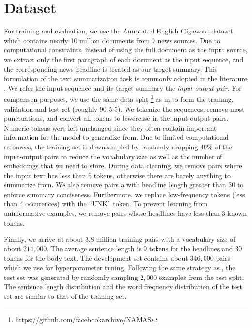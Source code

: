 \section{Dataset}
\label{sec: dataset}

For training and evaluation, we use the Annotated English Gigaword dataset \cite{graff2003english}, which contains nearly 10 million documents from 7 news sources. Due to computational constraints, instead of using the full document as the input source, we extract only the first paragraph of each document as the input sequence, and the corresponding news headline is treated as our target summary. This formulation of the text summarization task is commonly adopted in the literature \cite{rush2015neural}. We refer the input sequence and its target summary the \textit{input-output pair}. For comparison purposes, we use the same data split \footnote{https://github.com/facebookarchive/NAMAS} as in \cite{rush2015neural} to form the training, validation and test set (roughly 90-5-5). We tokenize the sequences, remove most punctuations, and convert all tokens to lowercase in the input-output pairs. Numeric tokens were left unchanged since they often contain important information for the model to generalize from. Due to limited computational resources, the training set is downsampled by randomly dropping $40\%$ of the input-output pairs to reduce the vocabulary size as well as the number of embeddings that we need to store. During data cleaning, we remove pairs where the input text has less than $5$ tokens, otherwise there are barely anything to summarize from. We also remove pairs a with headline length greater than $30$ to enforce summary conciseness. Furthermore, we replace low-frequency tokens (less than $4$ occurences) with the ``UNK'' token. To prevent learning from uninformative examples, we remove pairs whose headlines have less than $3$ known tokens. 

Finally, we arrive at about $3.8$ million training pairs with a vocabulary size of about $214,000$. The average sentence length is $9$ tokens for the headlines and $30$ tokens for the body text. The development set contains about $346,000$ pairs which we use for hyperparameter tuning. Following the same strategy as \cite{rush2015neural}, the test set was generated by randomly sampling $2,000$ examples from the test split. The sentence length distribution and the word frequency distribution of the test set are similar to that of the training set.
